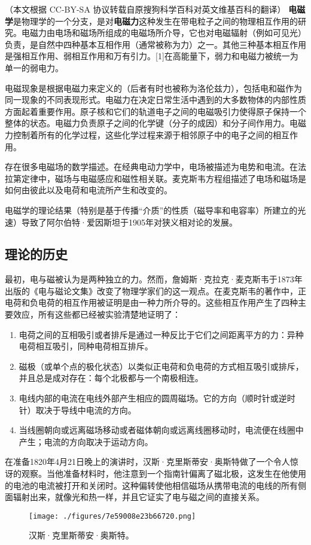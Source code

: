 
（本文根据 CC-BY-SA 协议转载自原搜狗科学百科对英文维基百科的翻译）
\textbf{电磁学}是物理学的一个分支，是对\textbf{电磁力}这种发生在带电粒子之间的物理相互作用的研究。电磁力由电场和磁场所组成的电磁场所介导，它也对电磁辐射（例如可见光）负责，是自然中四种基本互相作用（通常被称为力）之一。其他三种基本相互作用是强相互作用、弱相互作用和万有引力。[1]在高能量下，弱力和电磁力被统一为单一的弱电力。

电磁现象是根据电磁力来定义的（后者有时也被称为洛伦兹力），包括电和磁作为同一现象的不同表现形式。电磁力在决定日常生活中遇到的大多数物体的内部性质方面起着重要作用。原子核和它们的轨道电子之间的电磁吸引力使得原子保持一个整体的状态。电磁力负责原子之间的化学键（分子的成因）和分子间作用力。电磁力控制着所有的化学过程，这些化学过程来源于相邻原子中的电子之间的相互作用。

存在很多电磁场的数学描述。在经典电动力学中，电场被描述为电势和电流。在法拉第定律中，磁场与电磁感应和磁性相关联。麦克斯韦方程组描述了电场和磁场是如何由彼此以及电荷和电流所产生和改变的。

电磁学的理论结果（特别是基于传播“介质”的性质（磁导率和电容率）所建立的光速）导致了阿尔伯特·爱因斯坦于1905年对狭义相对论的发展。

\subsection{理论的历史}
最初，电与磁被认为是两种独立的力。然而，詹姆斯·克拉克·麦克斯韦于1873年出版的《电与磁论文集》改变了物理学家们的这一观点。在麦克斯韦的著作中，正电荷和负电荷的相互作用被证明是由一种力所介导的。这些相互作用产生了四种主要效应，所有这些都已经被实验清楚地证明了：
\begin{enumerate}
\item 电荷之间的互相吸引或者排斥是通过一种反比于它们之间距离平方的力：异种电荷相互吸引，同种电荷相互排斥。
\item 磁极（或单个点的极化状态）以类似正电荷和负电荷的方式相互吸引或排斥，并且总是成对存在：每个北极都与一个南极相连。
\item 电线内部的电流在电线外部产生相应的圆周磁场。它的方向（顺时针或逆时针）取决于导线中电流的方向。
\item 当线圈朝向或远离磁场移动或者磁体朝向或远离线圈移动时，电流便在线圈中产生；电流的方向取决于运动方向。
\end{enumerate}

在准备1820年4月21日晚上的演讲时，汉斯·克里斯蒂安·奥斯特做了一个令人惊讶的观察。当他准备材料时，他注意到一个指南针偏离了磁北极，这发生在他使用的电池的电流被打开和关闭时。这种偏转使他相信磁场从携带电流的电线的所有侧面辐射出来，就像光和热一样，并且它证实了电与磁之间的直接关系。
\begin{figure}[ht]
\centering
\texttt{[image: ./figures/7e59008e23b66720.png]}
\caption{汉斯·克里斯蒂安·奥斯特。} \label{fig_DCXHZY_1}
\end{figure}

